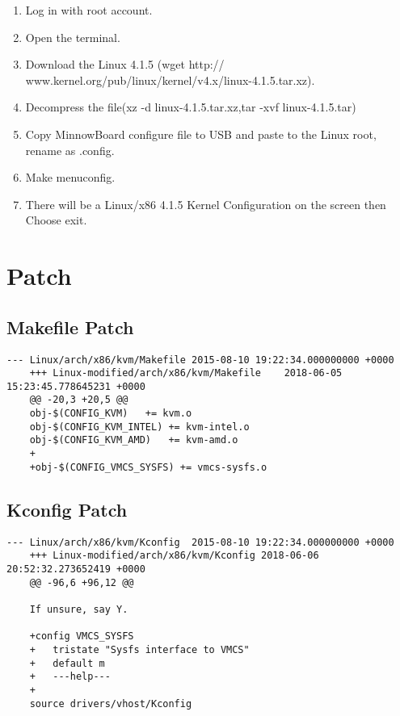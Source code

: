 \documentclass[10pt,draftclsnofoot,journal,compsoc,onecolumn]{IEEEtran}
\begin{document}
	\begin{enumerate}
		\item Log in with root account.
		\item Open the terminal.
		\item Download the Linux 4.1.5 (wget http:// www.kernel.org/pub/linux/kernel/v4.x/linux-4.1.5.tar.xz).
		\item Decompress the file(xz -d linux-4.1.5.tar.xz,tar -xvf linux-4.1.5.tar)
		\item Copy MinnowBoard configure file to USB and paste to the Linux root, rename as .config.
		\item Make menuconfig.
		\item There will be a Linux/x86 4.1.5 Kernel Configuration on the screen then Choose exit.
	\end{enumerate}
	
	\section{Patch}
	\subsection{Makefile Patch}
	\begin{lstlisting}[style=CStyle]
	--- Linux/arch/x86/kvm/Makefile	2015-08-10 19:22:34.000000000 +0000
	+++ Linux-modified/arch/x86/kvm/Makefile	2018-06-05 15:23:45.778645231 +0000
	@@ -20,3 +20,5 @@
	obj-$(CONFIG_KVM)	+= kvm.o
	obj-$(CONFIG_KVM_INTEL)	+= kvm-intel.o
	obj-$(CONFIG_KVM_AMD)	+= kvm-amd.o
	+
	+obj-$(CONFIG_VMCS_SYSFS) += vmcs-sysfs.o
	\end{lstlisting}
	
	\subsection{Kconfig Patch}
	\begin{lstlisting}[style=CStyle]
	--- Linux/arch/x86/kvm/Kconfig	2015-08-10 19:22:34.000000000 +0000
	+++ Linux-modified/arch/x86/kvm/Kconfig	2018-06-06 20:52:32.273652419 +0000
	@@ -96,6 +96,12 @@
	
	If unsure, say Y.
	
	+config VMCS_SYSFS
	+	tristate "Sysfs interface to VMCS"
	+	default m
	+	---help---
	+
	source drivers/vhost/Kconfig
	
	\end{lstlisting}
	
\end{document}
